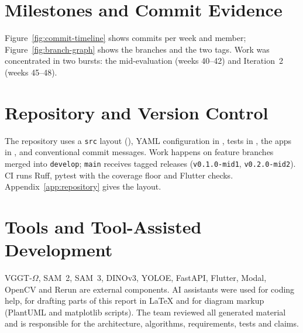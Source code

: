 \section{Milestones and Commit Evidence}
Figure~\ref{fig:commit-timeline} shows commits per week and member;
Figure~\ref{fig:branch-graph} shows the branches and the two tags. Work was
concentrated in two bursts: the mid-evaluation (weeks 40--42) and Iteration~2
(weeks 45--48).


\section{Repository and Version Control}
The repository uses a \texttt{src} layout (), YAML
configuration in , tests in , the apps in
, and conventional commit messages. Work happens on feature
branches merged into \texttt{develop}; \texttt{main} receives tagged releases
(\texttt{v0.1.0-mid1}, \texttt{v0.2.0-mid2}). CI runs Ruff, pytest with the
coverage floor and Flutter checks. Appendix~\ref{app:repository} gives the
layout.

\section{Tools and Tool-Assisted Development}
\label{sec:tools}
VGGT-$\Omega$, SAM~2, SAM~3, DINOv3, YOLOE, FastAPI, Flutter, Modal, OpenCV and
Rerun are external components. AI assistants were used for coding help, for
drafting parts of this report in LaTeX and for diagram markup (PlantUML and
matplotlib scripts). The team reviewed all generated material and is responsible
for the architecture, algorithms, requirements, tests and claims.

